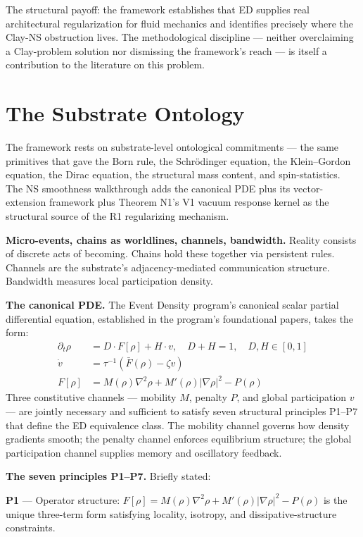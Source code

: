 \documentclass[11pt,a4paper]{article}
\begin{document}
The structural payoff: the framework establishes that ED supplies real architectural regularization for fluid mechanics and identifies precisely where the Clay-NS obstruction lives. The methodological discipline --- neither overclaiming a Clay-problem solution nor dismissing the framework's reach --- is itself a contribution to the literature on this problem.

\section{The Substrate Ontology}

The framework rests on substrate-level ontological commitments --- the same primitives that gave the Born rule, the Schr\"odinger equation, the Klein--Gordon equation, the Dirac equation, the structural mass content, and spin-statistics. The NS smoothness walkthrough adds the canonical PDE plus its vector-extension framework plus Theorem N1's V1 vacuum response kernel as the structural source of the R1 regularizing mechanism.

\textbf{Micro-events, chains as worldlines, channels, bandwidth.} Reality consists of discrete acts of becoming. Chains hold these together via persistent rules. Channels are the substrate's adjacency-mediated communication structure. Bandwidth measures local participation density.

\textbf{The canonical PDE.} The Event Density program's canonical scalar partial differential equation, established in the program's foundational papers, takes the form:
\begin{align*}
\partial_t\rho &= D \cdot F[\rho] + H \cdot v, \quad D + H = 1, \quad D, H \in [0, 1] \\
\dot v &= \tau^{-1}(\bar F(\rho) - \zeta v) \\
F[\rho] &= M(\rho)\nabla^2\rho + M'(\rho)|\nabla\rho|^2 - P(\rho)
\end{align*}
Three constitutive channels --- mobility $M$, penalty $P$, and global participation $v$ --- are jointly necessary and sufficient to satisfy seven structural principles P1--P7 that define the ED equivalence class. The mobility channel governs how density gradients smooth; the penalty channel enforces equilibrium structure; the global participation channel supplies memory and oscillatory feedback.

\textbf{The seven principles P1--P7.} Briefly stated:

\textbf{P1} --- Operator structure: $F[\rho] = M(\rho)\nabla^2\rho + M'(\rho)|\nabla\rho|^2 - P(\rho)$ is the unique three-term form satisfying locality, isotropy, and dissipative-structure constraints.
\end{document}
